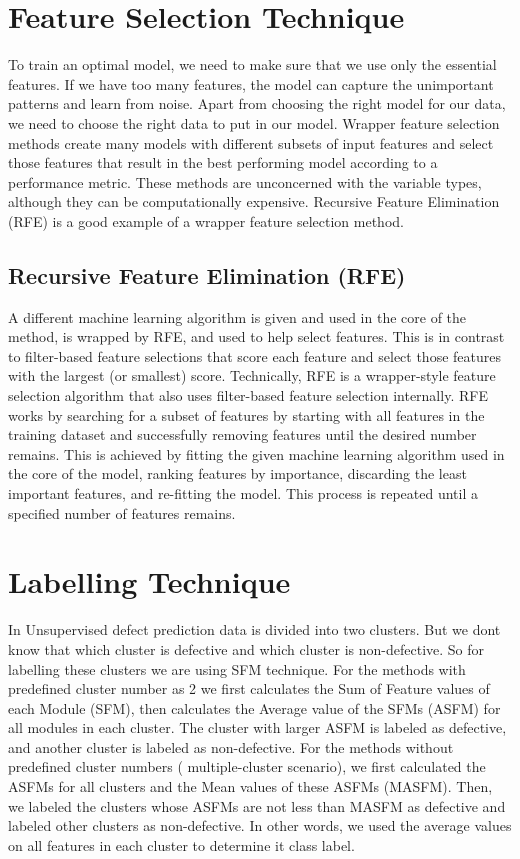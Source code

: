 \section{Feature Selection Technique }

To train an optimal model, we need to make sure that we use only the essential features. If we have too many features, the model can capture the unimportant patterns and learn from noise. Apart from choosing the right model for our data, we need to choose the right data to put in our model. 
Wrapper feature selection methods create many models with different subsets of input features and select those features that result in the best performing model according to a performance metric. These methods are unconcerned with the variable types, although they can be computationally expensive. 
Recursive Feature Elimination (RFE) is a good example of a wrapper feature selection method.

\subsection{Recursive Feature Elimination (RFE)}

A different machine learning algorithm is given and used in the core of the method, is wrapped by RFE, and used to help select features. This is in contrast to filter-based feature selections that score each feature and select those features with the largest (or smallest) score.
Technically, RFE is a wrapper-style feature selection algorithm that also uses filter-based feature selection internally.
RFE works by searching for a subset of features by starting with all features in the training dataset and successfully removing features until the desired number remains.
This is achieved by fitting the given machine learning algorithm used in the core of the model, ranking features by importance, discarding the least important features, and re-fitting the model. This process is repeated until a specified number of features remains.

\section{Labelling Technique}
In Unsupervised defect prediction data is divided into two clusters. But we dont know that which cluster is defective and which cluster is non-defective. So for labelling these clusters we are using SFM technique.\cite{zhang2016cross}\newline
For the methods with predefined cluster number as 2 we first calculates the Sum of Feature values of each Module (SFM), then calculates the Average value of the SFMs (ASFM) for all modules in each cluster. The cluster with larger ASFM is labeled as defective, and another cluster is labeled as non-defective.\newline 
For the methods without predefined cluster numbers ( multiple-cluster scenario), we first calculated the ASFMs for all clusters and the Mean values of these ASFMs (MASFM). Then, we labeled the clusters whose
ASFMs are not less than MASFM as defective and labeled other clusters as non-defective. In other words, we used the average values on all features in each cluster to determine it class label.

